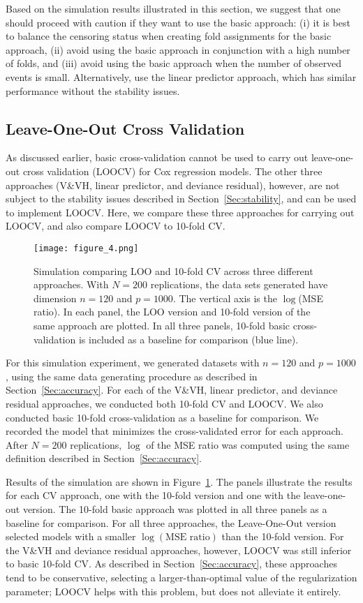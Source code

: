 Based on the simulation results illustrated in this section, we suggest that one should proceed with caution if they want to use the basic approach: (i) it is best to balance the censoring status when creating fold assignments for the basic approach, (ii) avoid using the basic approach in conjunction with a high number of folds, and (iii) avoid using the basic approach when the number of observed events is small. Alternatively, use the linear predictor approach, which has similar performance without the stability issues.

\subsection {Leave-One-Out Cross Validation}
\label{Sec:loocv}

As discussed earlier, basic cross-validation cannot be used to carry out leave-one-out cross validation (LOOCV) for Cox regression models. The other three approaches (V\&VH, linear predictor, and deviance residual), however, are not subject to the stability issues described in Section~\ref{Sec:stability}, and can be used to implement LOOCV.  Here, we compare these three approaches for carrying out LOOCV, and also compare LOOCV to 10-fold CV.

\begin{figure}[!htb]
  \centering
  \texttt{[image: figure\_4.png]}
  \caption{\label{Fig:loocv}Simulation comparing LOO and 10-fold CV across three different approaches. With $N = 200$ replications, the data sets generated have dimension $n = 120$ and $p = 1000$. The vertical axis is the $\log$(MSE ratio). In each panel, the LOO version and 10-fold version of the same approach are plotted. In all three panels, 10-fold basic cross-validation is included as a baseline for comparison (blue line).}
\end{figure}	

For this simulation experiment, we generated datasets with $n = 120$ and $p = 1000$, using the same data generating procedure as described in Section~\ref{Sec:accuracy}. For each of the V\&VH, linear predictor, and deviance residual approaches, we conducted both 10-fold CV and LOOCV. We also conducted basic 10-fold cross-validation as a baseline for comparison. We recorded the model that minimizes the cross-validated error  for each approach. After $N = 200$ replications, $\log$ of the MSE ratio was computed using the same definition described in Section~\ref{Sec:accuracy}.

Results of the simulation are shown in Figure~\ref{Fig:loocv}. The panels illustrate the results for each CV approach, one with the 10-fold version and one with the leave-one-out version. The 10-fold basic approach was plotted in all three panels as a baseline for comparison.  For all three approaches, the Leave-One-Out version selected models with a smaller $\log(\text{MSE ratio})$ than the 10-fold version. For the V\&VH and deviance residual approaches, however, LOOCV was still inferior to basic 10-fold CV.  As described in Section~\ref{Sec:accuracy}, these approaches tend to be conservative, selecting a larger-than-optimal value of the regularization parameter; LOOCV helps with this problem, but does not alleviate it entirely.

